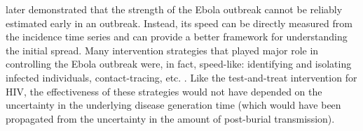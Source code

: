 \documentclass[12pt]{article}
\begin{document}
\cite{weitz2015modeling} later demonstrated that the strength of the Ebola outbreak cannot be reliably estimated early in an outbreak.
Instead, its speed can be directly measured from the incidence time series \citep{chowell2003sars, mills2004transmissibility, nishiura2009transmission, nishiura2010pros, ma2014estimating} and can provide a better framework for understanding the initial spread.
Many intervention strategies that played major role in controlling the Ebola outbreak were, in fact, speed-like: identifying and isolating infected individuals, contact-tracing, etc. \citep{pandey2014strategies}.
Like the test-and-treat intervention for HIV, the effectiveness of these strategies would not have depended on the uncertainty in the underlying disease generation time (which would have been propagated from the uncertainty in the amount of post-burial transmission).



\end{document}
